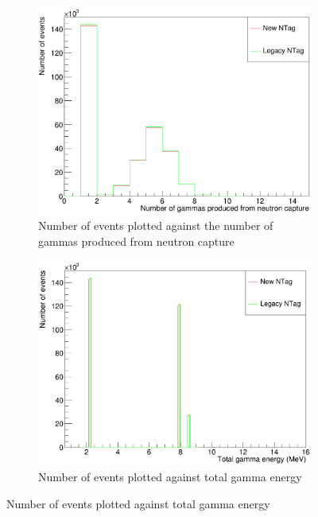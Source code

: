 \begin{figure}
    \centering
     \begin{subfigure}[b]{0.49\linewidth}
      \includegraphics[width=\linewidth]{Figures/NGamma.PNG}
      \caption{Number of events plotted against the number of gammas produced from neutron capture}
      \label{fig:NGamma} 
     \end{subfigure}
     \begin{subfigure}[b]{0.49\linewidth}
       \includegraphics[width=\linewidth]{Figures/TotGammaE.PNG}
        \caption{Number of events plotted against total gamma energy} 
     \label{fig:TotGammaE}
      \end{subfigure} 
\end{figure}

